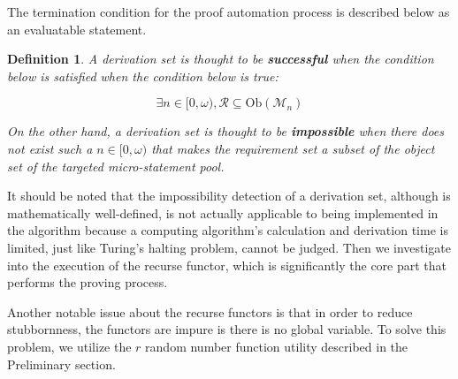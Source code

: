 \documentclass{aims}
\numberwithin{equation}{section}
\newtheorem{definition}{Definition}	%
\numberwithin{theorem}{section}	%
\numberwithin{axiom}{section}	%
\numberwithin{definition}{section}	%
\begin{document}
	The termination condition for the proof automation process is described below as an evaluatable statement. 
	
	\begin{definition}
		A derivation set is thought to be \textbf{ successful} when the condition below is satisfied when the condition below is true:
		
		\begin{equation}
			\exists n\in [0,\omega ), \mathcal{R}\subseteq \text{Ob}\left(\mathcal{M}_n\right)
		\end{equation}
		
		On the other hand, a derivation set is thought to be \textbf{ impossible} when there does not exist such a \(n\in [0,\omega )\) that makes the requirement set a subset of the object set of the targeted micro-statement pool.
	\end{definition}
	
	It should be noted that the impossibility detection of a derivation set, although is mathematically well-defined, is not actually applicable to being implemented in the algorithm because a computing algorithm{'}s calculation and derivation time is limited, just like Turing{'}s halting problem, cannot be judged. Then we investigate into the execution of the recurse functor, which is significantly the core part that performs the proving process.
	
	Another notable issue about the recurse functors is that in order to reduce stubbornness, the functors are impure is there is no global variable. To solve this problem, we utilize the \(\mathit{r}\) random number function utility described in the Preliminary section.
	
\end{document}
